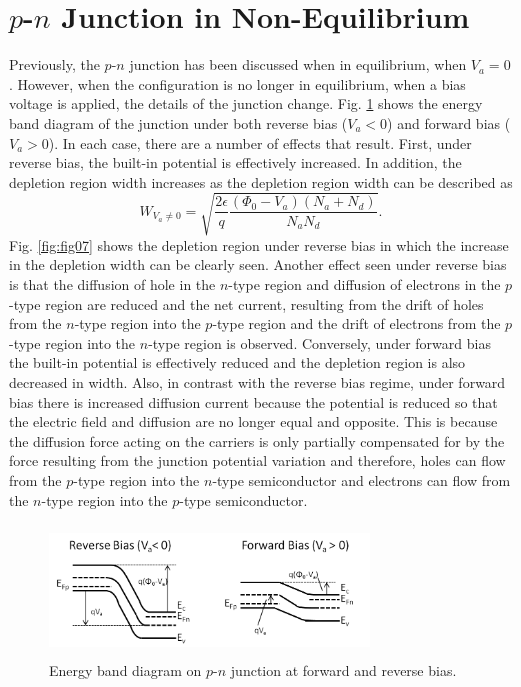 \section{$p$-$n$ Junction in Non-Equilibrium}\label{sec:sec003}
Previously, the $p$-$n$ junction has been discussed when in equilibrium, when $V_a = 0$. However,
when the configuration is no longer in equilibrium, when a bias voltage is applied, the details of the 
junction change. Fig. \ref{fig:fig05} shows the energy band diagram of the junction under both 
reverse bias ($V_a<0$) and forward bias ($V_a>0$). In each case, there are a number of effects that result. 
First, under reverse bias, the built-in potential is effectively increased. In addition, the depletion region width
increases as the depletion region width can be described as 
\begin{equation}
    W_{V_a\neq0} = \sqrt{\frac{2\epsilon}{q}\frac{\left(\Phi_0-V_a\right)\left(N_a+N_d\right)}{N_aN_d}}.
\end{equation}
Fig. \ref{fig:fig07} shows the depletion region under reverse bias in which the increase in the 
depletion width can be clearly seen. Another effect seen under reverse bias is that the 
diffusion of hole in the $n$-type region and diffusion of electrons in the $p$-type region are reduced and the net current,
resulting from the drift of holes from the $n$-type region into the $p$-type region and the drift of electrons
from the $p$-type region into the $n$-type region is observed. Conversely, under forward bias the built-in potential
is effectively reduced and the depletion region is also decreased in width. Also, in contrast with the reverse bias regime, 
under forward bias there is increased diffusion current because the potential is reduced so that the electric field and diffusion are 
no longer equal and opposite. This is because the diffusion force acting on the carriers is only partially compensated for by the force resulting
from the junction potential variation and therefore, holes can flow from the $p$-type region into the $n$-type semiconductor and electrons can flow
from the $n$-type region into the $p$-type semiconductor. 
\begin{figure}[h!]\label{fig:fig05}
    \centering
    \includegraphics[height=3.5cm,width=8.5cm]{figs/bias_pn_junction}
    \caption{Energy band diagram on $p$-$n$ junction at forward and reverse bias.}
\end{figure}

